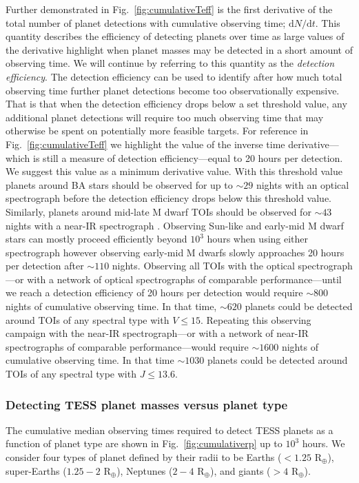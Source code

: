 Further demonstrated in Fig.~\ref{fig:cumulativeTeff} is the first derivative of the total number of
planet detections with cumulative observing time; $\text{d}N/\text{d}t$.
This quantity describes the efficiency of detecting planets over
time as large values of the derivative highlight when planet masses may be detected in a short amount of observing
time. We will continue by referring to this quantity as the \emph{detection efficiency}. The detection efficiency
can be used to identify after how much total
observing time further planet detections become too observationally expensive. That is that when the detection
efficiency drops below a set threshold value, any additional planet detections will require too much
observing time that may otherwise be spent on potentially more feasible targets.
For reference in Fig.~\ref{fig:cumulativeTeff}
we highlight the value of the inverse time derivative---which is still a measure of detection efficiency---equal
to 20 hours per detection. We suggest this value as a minimum
derivative value. With this threshold value planets around BA stars should be observed for up to $\sim 29$ nights 
with an optical spectrograph before the detection efficiency drops below this threshold value.
Similarly, planets around mid-late M dwarf TOIs should be observed for $\sim 43$ nights
with a near-IR spectrograph . Observing Sun-like and early-mid M dwarf stars can mostly proceed efficiently beyond
$10^3$ hours when using either spectrograph however observing early-mid M dwarfs slowly approaches 20 hours per
detection after $\sim 110$ nights.
Observing all TOIs with the optical spectrograph---or with a network of optical spectrographs of
comparable performance---until we reach a detection efficiency of
20 hours per detection would require $\sim 800$ nights of cumulative observing time.
In that time, $\sim 620$ planets could be detected around TOIs of any spectral type with $V \leq 15$.
Repeating this observing campaign with the near-IR
spectrograph---or with a network of near-IR spectrographs of comparable performance---would require $\sim 1600$ nights
of cumulative observing time. In that time $\sim 1030$ planets could be detected around TOIs
of any spectral type with $J \leq 13.6$.

\subsubsection{Detecting TESS planet masses versus planet type}
The cumulative median observing times required to detect TESS planets as a function of planet type 
are shown in Fig.~\ref{fig:cumulativerp} up to $10^3$ hours. We consider four types of planet defined by their radii to
be Earths ($<1.25$ R$_{\oplus}$), super-Earths ($1.25-2$ R$_{\oplus}$), Neptunes ($2-4$ R$_{\oplus}$),
and giants ($>4$ R$_{\oplus}$).


